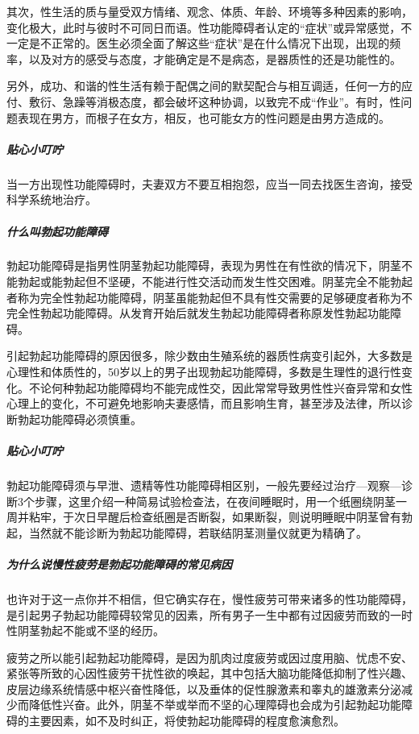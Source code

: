 其次，性生活的质与量受双方情绪、观念、体质、年龄、环境等多种因素的影响，变化极大，此时与彼时不可同日而语。性功能障碍者认定的“症状”或异常感觉，不一定是不正常的。医生必须全面了解这些“症状”是在什么情况下出现，出现的频率，以及对方的感受与态度，才能确定是不是病态，是器质性的还是功能性的。

另外，成功、和谐的性生活有赖于配偶之间的默契配合与相互调适，任何一方的应付、敷衍、急躁等消极态度，都会破坏这种协调，以致完不成“作业”。有时，性问题表现在男方，而根子在女方，相反，也可能女方的性问题是由男方造成的。

\subparagraph{贴心小叮咛}

当一方出现性功能障碍时，夫妻双方不要互相抱怨，应当一同去找医生咨询，接受科学系统地治疗。

\subparagraph{什么叫勃起功能障碍}

勃起功能障碍是指男性阴茎勃起功能障碍，表现为男性在有性欲的情况下，阴茎不能勃起或能勃起但不坚硬，不能进行性交活动而发生性交困难。阴茎完全不能勃起者称为完全性勃起功能障碍，阴茎虽能勃起但不具有性交需要的足够硬度者称为不完全性勃起功能障碍。从发育开始后就发生勃起功能障碍者称原发性勃起功能障碍。

引起勃起功能障碍的原因很多，除少数由生殖系统的器质性病变引起外，大多数是心理性和体质性的，50岁以上的男子出现勃起功能障碍，多数是生理性的退行性变化。不论何种勃起功能障碍均不能完成性交，因此常常导致男性性兴奋异常和女性心理上的变化，不可避免地影响夫妻感情，而且影响生育，甚至涉及法律，所以诊断勃起功能障碍必须慎重。

\subparagraph{贴心小叮咛}

勃起功能障碍须与早泄、遗精等性功能障碍相区别，一般先要经过治疗—观察—诊断3个步骤，这里介绍一种简易试验检查法，在夜间睡眠时，用一个纸圈绕阴茎一周并粘牢，于次日早醒后检查纸圈是否断裂，如果断裂，则说明睡眠中阴茎曾有勃起，当然就不能诊断为勃起功能障碍，若联结阴茎测量仪就更为精确了。

\subparagraph{为什么说慢性疲劳是勃起功能障碍的常见病因}

也许对于这一点你并不相信，但它确实存在，慢性疲劳可带来诸多的性功能障碍，是引起男子勃起功能障碍较常见的因素，所有男子一生中都有过因疲劳而致的一时性阴茎勃起不能或不坚的经历。

疲劳之所以能引起勃起功能障碍，是因为肌肉过度疲劳或因过度用脑、忧虑不安、紧张等所致的心因性疲劳干扰性欲的唤起，其中包括大脑功能降低抑制了性兴趣、皮层边缘系统情感中枢兴奋性降低，以及垂体的促性腺激素和睾丸的雄激素分泌减少而降低性兴奋。此外，阴茎不举或举而不坚的心理障碍也会成为引起勃起功能障碍的主要因素，如不及时纠正，将使勃起功能障碍的程度愈演愈烈。

